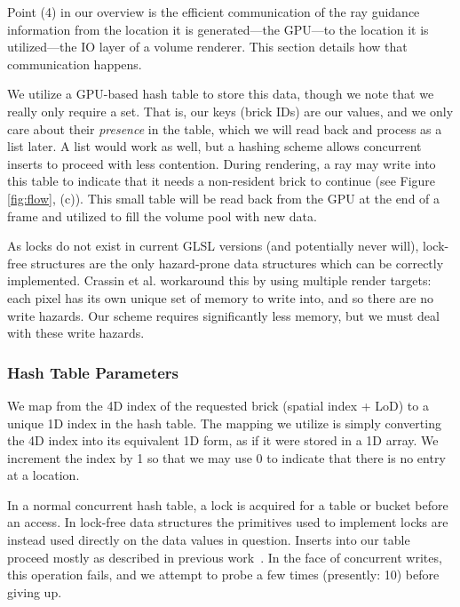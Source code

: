 Point (4) in our overview is the efficient communication of the ray
guidance information from the location it is generated---the GPU---to
the location it is utilized---the IO layer of a volume renderer.  This
section details how that communication happens.

We utilize a GPU-based hash table to store this data, though we note
that we really only require a set.  That is, our keys (brick IDs) are
our values, and we only care about their \emph{presence} in the table,
which we will read back and process as a list later.  A list would work
as well, but a hashing scheme allows concurrent inserts to proceed with
less contention.  During rendering, a ray may write into this table to
indicate that it
needs a non-resident brick to continue (see Figure \ref{fig:flow},
(c)).  This small table will be read back from the GPU at the end of a
frame and utilized to fill the volume pool with new data.

As locks do not exist in current GLSL versions (and potentially never
will), lock-free structures are the only hazard-prone data structures
which can be correctly implemented.  Crassin et
al.\cite{Crassin:2009:Gigavoxels} workaround this by using multiple
render targets: each pixel has its own unique set of memory to
write into, and so there are no write hazards.  Our scheme requires
significantly less memory, but we must deal with these write hazards.

\subsubsection{Hash Table Parameters}
\label{sec:ht-params}

We map from the 4D index of the requested brick (spatial index + LoD)
to a unique 1D index in the hash table.  The mapping we utilize is
simply converting the 4D index into its equivalent 1D form, as if it
were stored in a 1D array.  We increment the index by 1 so that we may
use 0 to indicate that there is no entry at a location.

In a normal concurrent hash table, a lock is acquired for a table or
bucket before an access.  In lock-free data structures the primitives
used to implement locks are instead used directly on the data values
in question.  Inserts into our table proceed mostly as described in
previous
work~\cite{Michael:2002:LockFreeHT}.  In the face of concurrent
writes, this operation fails, and we attempt to probe a few times
(presently: 10) before giving up.

